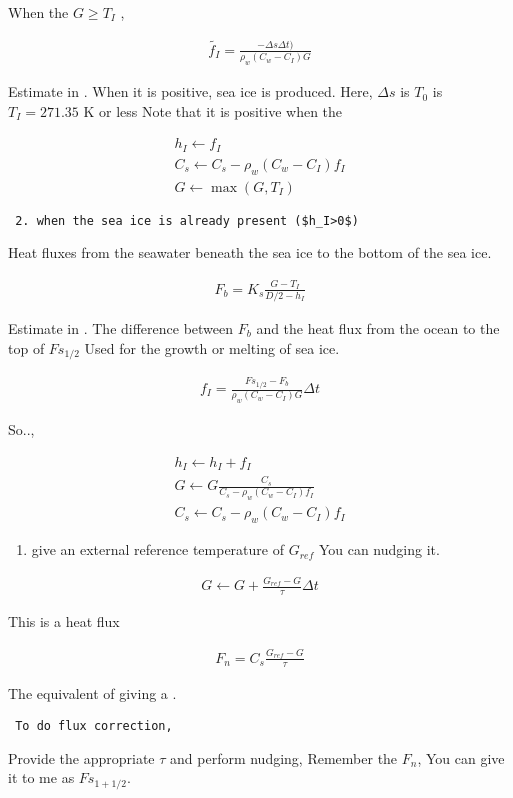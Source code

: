 When the \(G \ge T_I\) ,

\begin{eqnarray}
  \tilde{f_I}
  =  \frac{- \Delta s \Delta t )}
          {\rho_w ( C_w - C_I ) G}
\end{eqnarray}

Estimate in . When it is positive, sea ice is produced. Here,
\(\Delta s\) is \(T_0\) is \(T_I=271.35\) K or less Note that it is
positive when the

\begin{eqnarray}
  h_I  \leftarrow  f_I \\
  C_s  \leftarrow  C_s - \rho_w ( C_w - C_I ) f_I \\
  G    \leftarrow  \max( G, T_I )
\end{eqnarray}

\begin{verbatim}
 2. when the sea ice is already present ($h_I>0$)
\end{verbatim}

Heat fluxes from the seawater beneath the sea ice to the bottom of the
sea ice.

\begin{eqnarray}
  F_b = K_s \frac{ G - T_I }{ D/2 - h_I }
\end{eqnarray}

Estimate in . The difference between \(F_b\) and the heat flux from the
ocean to the top of \(Fs_{1/2}\) Used for the growth or melting of sea
ice.

\begin{eqnarray}
  f_I = \frac{ Fs_{1/2} - F_b }
             { \rho_w ( C_w - C_I ) G } \Delta t
\end{eqnarray}

So..,

\begin{eqnarray}
  h_I  \leftarrow  h_I + f_I \\
  G    \leftarrow  G \frac{C_s}{C_s - \rho_w ( C_w - C_I ) f_I} \\
  C_s  \leftarrow  C_s - \rho_w ( C_w - C_I ) f_I
\end{eqnarray}

\begin{enumerate}
\def\labelenumi{\arabic{enumi}.}
\setcounter{enumi}{4}
\tightlist
\item
  give an external reference temperature of \(G_{ref}\) You can nudging
  it.
\end{enumerate}

\begin{eqnarray}
        G \leftarrow G + \frac{G_{ref} - G}{\tau} \Delta t
\end{eqnarray}

This is a heat flux

\begin{eqnarray}
        F_n = C_s \frac{G_{ref} - G}{\tau}
\end{eqnarray}

The equivalent of giving a .

\begin{verbatim}
 To do flux correction,
\end{verbatim}

Provide the appropriate \(\tau\) and perform nudging, Remember the
\(F_n\), You can give it to me as \(Fs_{1+1/2}\).
